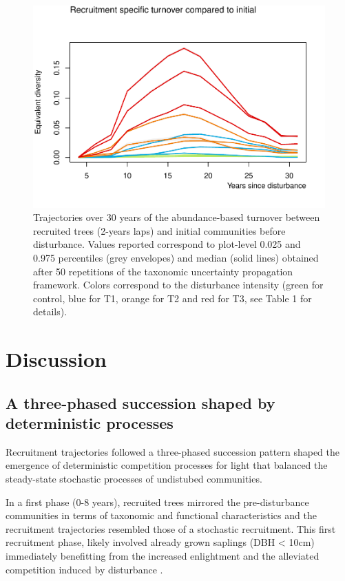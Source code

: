 \documentclass[fleqn,10pt]{ArtEcoFoG} %
\begin{document}
\begin{figure}

{\centering \includegraphics{RecruitmentTrajectories_files/figure-latex/Turnover-1} 

}

\caption{Trajectories over 30 years of the abundance-based turnover between recruited trees (2-years laps) and initial communities before disturbance. Values reported correspond to plot-level 0.025 and 0.975 percentiles (grey envelopes) and median (solid lines) obtained after 50 repetitions of the taxonomic uncertainty propagation framework. Colors correspond to the disturbance intensity (green for control, blue for T1, orange for T2 and red for T3, see Table 1 for details).}\label{fig:Turnover}
\end{figure}

\section{Discussion}\label{discussion}

\subsection{A three-phased succession shaped by deterministic
processes}\label{a-three-phased-succession-shaped-by-deterministic-processes}

Recruitment trajectories followed a three-phased succession pattern
shaped the emergence of deterministic competition processes for light
that balanced the steady-state stochastic processes of undistubed
communities.

In a first phase (0-8 years), recruited trees mirrored the
pre-disturbance communities in terms of taxonomic and functional
characteristics and the recruitment trajectories resembled those of a
stochastic recruitment. This first recruitment phase, likely involved
already grown saplings (DBH \textless{} 10cm) immediately benefitting
from the increased enlightment and the alleviated competition induced by
disturbance \citep{Denslow2000, Herault2010}.
\end{document}
